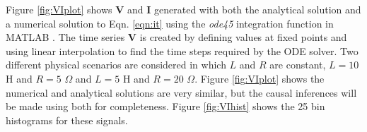 Figure \ref{fig:VIplot} shows $\mathbf{V}$ and $\mathbf{I}$ generated with both the analytical solution and a numerical solution to Eqn. \ref{eqn:it} using the {\em ode45} integration function in {\sc MATLAB }.  The time series $\mathbf{V}$ is created by defining values at fixed points and using linear interpolation to find the time steps required by the ODE solver.  Two different physical scenarios are considered in which $L$ and $R$ are constant, $L=10$ H and $R=5$ $\Omega$ and $L=5$ H and $R=20$ $\Omega$.  Figure \ref{fig:VIplot} shows the numerical and analytical solutions are very similar, but the causal inferences will be made using both for completeness.  Figure \ref{fig:VIhist} shows the 25 bin histograms for these signals.
